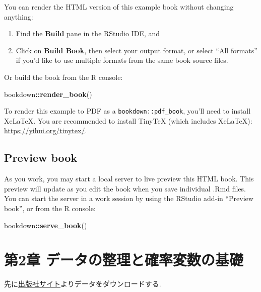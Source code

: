 \documentclass[
]{book}
\newenvironment{Shaded}{\begin{snugshade}}{\end{snugshade}}
\newcommand{\FunctionTok}[1]{\textcolor[rgb]{0.13,0.29,0.53}{\textbf{#1}}}
\newcommand{\NormalTok}[1]{#1}
\newcommand{\SpecialCharTok}[1]{\textcolor[rgb]{0.81,0.36,0.00}{\textbf{#1}}}
\begin{document}
You can render the HTML version of this example book without changing anything:

\begin{enumerate}
\def\labelenumi{\arabic{enumi}.}
\item
  Find the \textbf{Build} pane in the RStudio IDE, and
\item
  Click on \textbf{Build Book}, then select your output format, or select ``All formats'' if you'd like to use multiple formats from the same book source files.
\end{enumerate}

Or build the book from the R console:

\begin{Shaded}
\begin{Highlighting}[]
\NormalTok{bookdown}\SpecialCharTok{::}\FunctionTok{render\_book}\NormalTok{()}
\end{Highlighting}
\end{Shaded}

To render this example to PDF as a \texttt{bookdown::pdf\_book}, you'll need to install XeLaTeX. You are recommended to install TinyTeX (which includes XeLaTeX): \url{https://yihui.org/tinytex/}.

\hypertarget{preview-book}{%
\section{Preview book}\label{preview-book}}

As you work, you may start a local server to live preview this HTML book. This preview will update as you edit the book when you save individual .Rmd files. You can start the server in a work session by using the RStudio add-in ``Preview book'', or from the R console:

\begin{Shaded}
\begin{Highlighting}[]
\NormalTok{bookdown}\SpecialCharTok{::}\FunctionTok{serve\_book}\NormalTok{()}
\end{Highlighting}
\end{Shaded}

\hypertarget{ch2}{%
\chapter*{第2章 データの整理と確率変数の基礎}\label{ch2}}

先に\href{https://www.yuhikaku.co.jp/books/detail/9784641053854}{出版社サイト}よりデータをダウンロードする.
\end{document}
